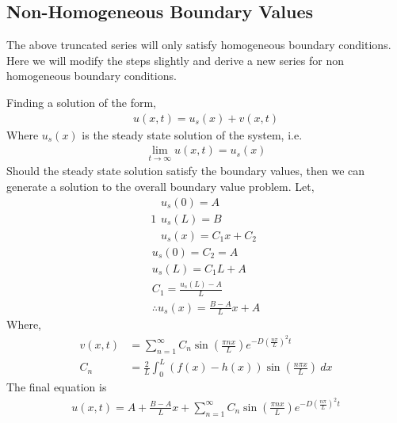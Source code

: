 \documentclass{article}
\begin{document}
\subsection{Non-Homogeneous Boundary Values}
The above truncated series will only satisfy homogeneous boundary conditions. Here we will modify the steps slightly and derive a new series for non homogeneous boundary conditions.

Finding a solution of the form,
\[
	\begin{split}
		u(x, t) = u_s(x) + v(x, t)
	\end{split}
\]
Where $u_s(x)$ is the steady state solution of the system, i.e.
\[
	\begin{split}
		\lim_{t\rightarrow\infty} u(x, t) = u_s(x)
	\end{split}
\]
Should the steady state solution satisfy the boundary values, then we can generate a solution to the overall boundary value problem. Let,
\[1
	\begin{split}
		u_s(0) = A \\
		u_s(L) = B \\
		u_s(x) = C_1x + C_2
	\end{split}
\]
\[
	\begin{split}
		u_s(0) = C_2 = A \\
		u_s(L) = C_1L + A \\
		C_1 = \frac{u_s(L) - A}{L} \\
		\therefore u_s(x) = \frac{B - A}{L}x + A
	\end{split}
\]
Where,
\[
	\begin{split}
		v(x, t) &= \sum^{\infty}_{n = 1}C_n\sin{\left(\frac{\pi nx}{L}\right)}e^{-D\left(\frac{n\pi}{L}\right)^2t} \\
		C_n &= \frac{2}{L}\int^L_0 (f(x) - h(x))\sin{\left(\frac{n\pi x}{L}\right)} \ dx
	\end{split}
\]
The final equation is
\[
	\begin{split}
		u(x, t) = A + \frac{B - A}{L}x + \sum^{\infty}_{n=1}C_n\sin{\left(\frac{\pi nx}{L}\right)}e^{-D\left(\frac{n\pi}{L}\right)^2t}
	\end{split}
\]
\end{document}
